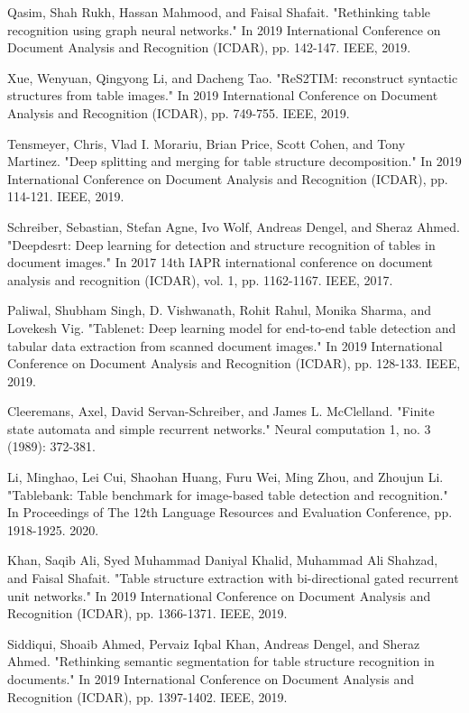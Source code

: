 \documentclass{ieeeaccess}
\begin{document}
\begin{thebibliography}{00}
 Qasim, Shah Rukh, Hassan Mahmood, and Faisal Shafait. "Rethinking table recognition using graph neural networks." In 2019 International Conference on Document Analysis and Recognition (ICDAR), pp. 142-147. IEEE, 2019.

 Xue, Wenyuan, Qingyong Li, and Dacheng Tao. "ReS2TIM: reconstruct syntactic structures from table images." In 2019 International Conference on Document Analysis and Recognition (ICDAR), pp. 749-755. IEEE, 2019.


  Tensmeyer, Chris, Vlad I. Morariu, Brian Price, Scott Cohen, and Tony Martinez. "Deep splitting and merging for table structure decomposition." In 2019 International Conference on Document Analysis and Recognition (ICDAR), pp. 114-121. IEEE, 2019.

 Schreiber, Sebastian, Stefan Agne, Ivo Wolf, Andreas Dengel, and Sheraz Ahmed. "Deepdesrt: Deep learning for detection and structure recognition of tables in document images." In 2017 14th IAPR international conference on document analysis and recognition (ICDAR), vol. 1, pp. 1162-1167. IEEE, 2017.

 Paliwal, Shubham Singh, D. Vishwanath, Rohit Rahul, Monika Sharma, and Lovekesh Vig. "Tablenet: Deep learning model for end-to-end table detection and tabular data extraction from scanned document images." In 2019 International Conference on Document Analysis and Recognition (ICDAR), pp. 128-133. IEEE, 2019.


 Cleeremans, Axel, David Servan-Schreiber, and James L. McClelland. "Finite state automata and simple recurrent networks." Neural computation 1, no. 3 (1989): 372-381.

 Li, Minghao, Lei Cui, Shaohan Huang, Furu Wei, Ming Zhou, and Zhoujun Li. "Tablebank: Table benchmark for image-based table detection and recognition." In Proceedings of The 12th Language Resources and Evaluation Conference, pp. 1918-1925. 2020.

 Khan, Saqib Ali, Syed Muhammad Daniyal Khalid, Muhammad Ali Shahzad, and Faisal Shafait. "Table structure extraction with bi-directional gated recurrent unit networks." In 2019 International Conference on Document Analysis and Recognition (ICDAR), pp. 1366-1371. IEEE, 2019.


 Siddiqui, Shoaib Ahmed, Pervaiz Iqbal Khan, Andreas Dengel, and Sheraz Ahmed. "Rethinking semantic segmentation for table structure recognition in documents." In 2019 International Conference on Document Analysis and Recognition (ICDAR), pp. 1397-1402. IEEE, 2019.


\end{thebibliography}
\end{document}
